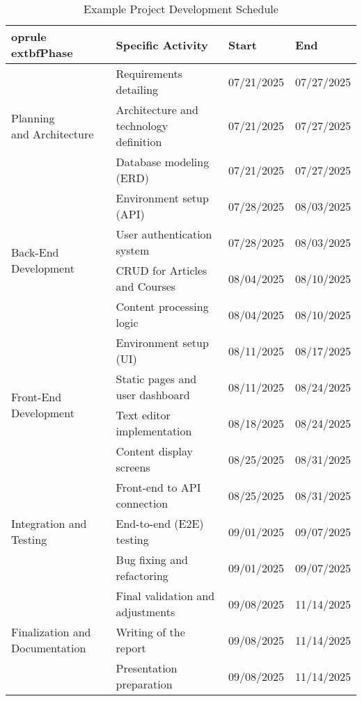 \begin{table}[h!]
\centering

\caption{Example Project Development Schedule}
\label{tab:schedule}
\renewcommand{\arraystretch}{1.3}
\begin{tabular}{@{}p{3.2cm} p{5.5cm} p{2.5cm} p{2.5cm}@{}}
	oprule
	extbf{Phase} & \textbf{Specific Activity} & \textbf{Start} & \textbf{End} \\
\midrule

\multirow{3}{*}{\parbox[l]{3cm}{Planning\\and Architecture}}
& Requirements detailing & 07/21/2025 & 07/27/2025 \\
& Architecture and technology definition & 07/21/2025 & 07/27/2025 \\
& Database modeling (ERD) & 07/21/2025 & 07/27/2025 \\
\midrule

\multirow{4}{*}{\parbox[l]{3cm}{Back-End Development}}
& Environment setup (API) & 07/28/2025 & 08/03/2025 \\
& User authentication system & 07/28/2025 & 08/03/2025 \\
& CRUD for Articles and Courses & 08/04/2025 & 08/10/2025 \\
& Content processing logic & 08/04/2025 & 08/10/2025 \\
\midrule

\multirow{4}{*}{\parbox[l]{3cm}{Front-End Development}}
& Environment setup (UI) & 08/11/2025 & 08/17/2025 \\
& Static pages and user dashboard & 08/11/2025 & 08/24/2025 \\
& Text editor implementation & 08/18/2025 & 08/24/2025 \\
& Content display screens & 08/25/2025 & 08/31/2025 \\
\midrule

\multirow{3}{*}{\parbox[l]{3cm}{Integration and Testing}}
& Front-end to API connection & 08/25/2025 & 08/31/2025 \\
& End-to-end (E2E) testing & 09/01/2025 & 09/07/2025 \\
& Bug fixing and refactoring & 09/01/2025 & 09/07/2025 \\
\midrule

\multirow{3}{*}{\parbox[l]{3cm}{Finalization and Documentation}}
& Final validation and adjustments & 09/08/2025 & 11/14/2025 \\
& Writing of the report & 09/08/2025 & 11/14/2025 \\
& Presentation preparation & 09/08/2025 & 11/14/2025 \\
\bottomrule
\end{tabular}
\end{table}